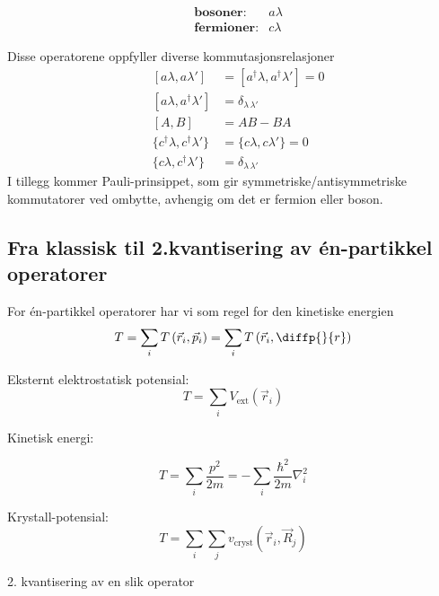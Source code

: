 \begin{align*}
&\textbf{bosoner}: &a\lambda \\ 
&\textbf{fermioner}: &c\lambda
\end{align*}


Disse operatorene oppfyller diverse kommutasjonsrelasjoner
\begin{align}
&[a\lambda, a\lambda'] & = [a^\dagger\lambda, a^\dagger\lambda'] = 0 \\
&[a\lambda, a^\dagger\lambda'] & = \delta_{\lambda\,\lambda'} \\
&[A,B] &= AB-BA \\
&\{c^\dagger\lambda, c^\dagger\lambda'\} & = \{c\lambda, c\lambda'\} = 0 \\
&\{c\lambda, c^\dagger\lambda'\} & = \delta_{\lambda\,\lambda'} 
\end{align}
I tillegg kommer Pauli-prinsippet, som gir symmetriske/antisymmetriske kommutatorer ved ombytte, avhengig om det er fermion eller boson. 

\subsection{Fra klassisk til 2.kvantisering av én-partikkel operatorer}

For én-partikkel operatorer har vi som regel for den kinetiske energien
\begin{equation}
T = \sum_i T\left(\vec{r}_i, \vec{p}_i\right) = \sum_i T\left(\vec{r}_i, \diffp{}{r}\right)
\end{equation}
\begin{theorem}
Eksternt elektrostatisk potensial:
\begin{equation}
T = \sum_i V_{\text{ext}}\left(\vec{r}_i\right)
\end{equation}
\end{theorem}
\begin{theorem}

Kinetisk energi:

\begin{equation}
T = \sum_i \frac{p^2}{2m} = -\sum_i \frac{\hbar^2}{2m}\nabla_i^2
\end{equation}
\end{theorem}

\begin{theorem}
Krystall-potensial:
\begin{equation}
T = \sum_i \sum_j v_{\text{cryst}} \left( \vec{r}_i, \vec{R}_j \right)
\end{equation}
\end{theorem}

2. kvantisering av en slik operator
